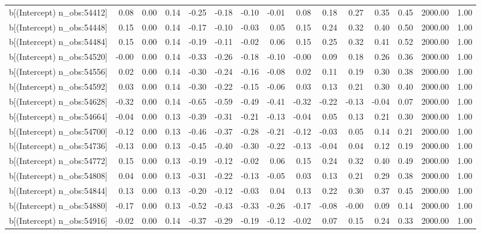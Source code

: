 \begin{table}[ht]
\begin{tabular}{rrrrrrrrrrrrrrr}
  b[(Intercept) n\_obs:54412] & 0.08 & 0.00 & 0.14 & -0.25 & -0.18 & -0.10 & -0.01 & 0.08 & 0.18 & 0.27 & 0.35 & 0.45 & 2000.00 & 1.00 \\ 
  b[(Intercept) n\_obs:54448] & 0.15 & 0.00 & 0.14 & -0.17 & -0.10 & -0.03 & 0.05 & 0.15 & 0.24 & 0.32 & 0.40 & 0.50 & 2000.00 & 1.00 \\ 
  b[(Intercept) n\_obs:54484] & 0.15 & 0.00 & 0.14 & -0.19 & -0.11 & -0.02 & 0.06 & 0.15 & 0.25 & 0.32 & 0.41 & 0.52 & 2000.00 & 1.00 \\ 
  b[(Intercept) n\_obs:54520] & -0.00 & 0.00 & 0.14 & -0.33 & -0.26 & -0.18 & -0.10 & -0.00 & 0.09 & 0.18 & 0.26 & 0.36 & 2000.00 & 1.00 \\ 
  b[(Intercept) n\_obs:54556] & 0.02 & 0.00 & 0.14 & -0.30 & -0.24 & -0.16 & -0.08 & 0.02 & 0.11 & 0.19 & 0.30 & 0.38 & 2000.00 & 1.00 \\ 
  b[(Intercept) n\_obs:54592] & 0.03 & 0.00 & 0.14 & -0.30 & -0.22 & -0.15 & -0.06 & 0.03 & 0.13 & 0.21 & 0.30 & 0.40 & 2000.00 & 1.00 \\ 
  b[(Intercept) n\_obs:54628] & -0.32 & 0.00 & 0.14 & -0.65 & -0.59 & -0.49 & -0.41 & -0.32 & -0.22 & -0.13 & -0.04 & 0.07 & 2000.00 & 1.00 \\ 
  b[(Intercept) n\_obs:54664] & -0.04 & 0.00 & 0.13 & -0.39 & -0.31 & -0.21 & -0.13 & -0.04 & 0.05 & 0.13 & 0.21 & 0.30 & 2000.00 & 1.00 \\ 
  b[(Intercept) n\_obs:54700] & -0.12 & 0.00 & 0.13 & -0.46 & -0.37 & -0.28 & -0.21 & -0.12 & -0.03 & 0.05 & 0.14 & 0.21 & 2000.00 & 1.00 \\ 
  b[(Intercept) n\_obs:54736] & -0.13 & 0.00 & 0.13 & -0.45 & -0.40 & -0.30 & -0.22 & -0.13 & -0.04 & 0.04 & 0.12 & 0.19 & 2000.00 & 1.00 \\ 
  b[(Intercept) n\_obs:54772] & 0.15 & 0.00 & 0.13 & -0.19 & -0.12 & -0.02 & 0.06 & 0.15 & 0.24 & 0.32 & 0.40 & 0.49 & 2000.00 & 1.00 \\ 
  b[(Intercept) n\_obs:54808] & 0.04 & 0.00 & 0.13 & -0.31 & -0.22 & -0.13 & -0.05 & 0.03 & 0.13 & 0.21 & 0.29 & 0.38 & 2000.00 & 1.00 \\ 
  b[(Intercept) n\_obs:54844] & 0.13 & 0.00 & 0.13 & -0.20 & -0.12 & -0.03 & 0.04 & 0.13 & 0.22 & 0.30 & 0.37 & 0.45 & 2000.00 & 1.00 \\ 
  b[(Intercept) n\_obs:54880] & -0.17 & 0.00 & 0.13 & -0.52 & -0.43 & -0.33 & -0.26 & -0.17 & -0.08 & -0.00 & 0.09 & 0.14 & 2000.00 & 1.00 \\ 
  b[(Intercept) n\_obs:54916] & -0.02 & 0.00 & 0.14 & -0.37 & -0.29 & -0.19 & -0.12 & -0.02 & 0.07 & 0.15 & 0.24 & 0.33 & 2000.00 & 1.00 \\ 

\end{tabular}
\end{table}
